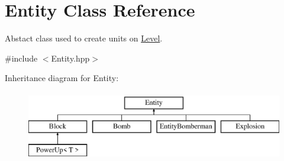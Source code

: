 \hypertarget{class_entity}{}\section{Entity Class Reference}
\label{class_entity}


Abstact class used to create units on \mbox{\hyperlink{class_level}{Level}}.  




{\ttfamily \#include $<$Entity.\+hpp$>$}

Inheritance diagram for Entity\+:\begin{figure}[H]
\begin{center}
\leavevmode
\includegraphics[height=3.000000cm]{class_entity}
\end{center}
\end{figure}
